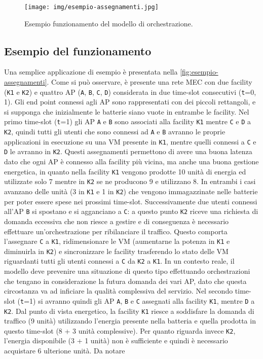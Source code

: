 \begin{figure}[t]
    \centering
    \texttt{[image: img/esempio-assegnamenti.jpg]}
    \caption{Esempio funzionamento del modello di orchestrazione.}
    \label{fig:esempio-assegnamenti}
\end{figure}


%
%
\subsection{Esempio del funzionamento}
\label{sub-sec:esempio-funzionamento}

Una semplice applicazione di esempio è presentata nella \autoref{fig:esempio-assegnamenti}. Come si può osservare, è presente una rete MEC con due facility (\texttt{K1} e \texttt{K2}) e quattro AP (\texttt{A}, \texttt{B}, \texttt{C}, \texttt{D}) considerata in due time-slot consecutivi (\texttt{t}=0, 1). Gli end point connessi agli AP sono rappresentati con dei piccoli rettangoli, e si supponga che inizialmente le batterie siano vuote in entrambe le facility. Nel primo time-slot (\texttt{t}=1) gli AP \texttt{A} e \texttt{B} sono associati alla facility \texttt{K1} mentre \texttt{C} e \texttt{D} a \texttt{K2}, quindi tutti gli utenti che sono connessi ad \texttt{A} e \texttt{B} avranno le proprie applicazioni in esecuzione su una VM presente in \texttt{K1}, mentre quelli connessi a \texttt{C} e \texttt{D} le avranno in \texttt{K2}. Questi assegnamenti permettono di avere una buona latenza dato che ogni AP è connesso alla facility più vicina, ma anche una buona gestione energetica, in quanto nella facility \texttt{K1} vengono prodotte 10 unità di energia ed utilizzate solo 7 mentre in \texttt{K2} se ne producono 9 e utilizzano 8. In entrambi i casi avanzano delle unità (3 in \texttt{K1} e 1 in \texttt{K2}) che vengono immagazzinate nelle batterie per poter essere spese nei prossimi time-slot. Successivamente due utenti connessi all'AP \texttt{B} si spostano e si agganciano a \texttt{C}: a questo punto \texttt{K2} riceve una richiesta di domanda eccessiva che non riesce a gestire e di conseguenza è necessario effettuare un'orchestrazione per ribilanciare il traffico. Questo comporta l'assegnare \texttt{C} a \texttt{K1}, ridimensionare le VM (aumentarne la potenza in \texttt{K1} e diminuirla in \texttt{K2}) e sincronizzare le facility trasferendo lo stato delle VM riguardanti tutti gli utenti connessi a \texttt{C} da \texttt{K2} a \texttt{K1}. In un contesto reale, il modello deve prevenire una situazione di questo tipo effettuando orchestrazioni che tengano in considerazione la futura domanda dei vari AP, dato che questa circostanza va ad inficiare la qualità complessiva del servizio. Nel secondo time-slot (\texttt{t}=1) si avranno quindi gli AP \texttt{A}, \texttt{B} e \texttt{C} assegnati alla facility \texttt{K1}, mentre \texttt{D} a \texttt{K2}. Dal punto di vista energetico, la facility \texttt{K1} riesce a soddisfare la domanda di traffico (9 unità) utilizzando l'energia presente nella batteria e quella prodotta in questo time-slot (8 + 3 unità complessive). Per quanto riguarda invece \texttt{K2}, l'energia disponibile (3 + 1 unità) non è sufficiente e quindi è necessario acquistare 6 ulterione unità. Da notare 